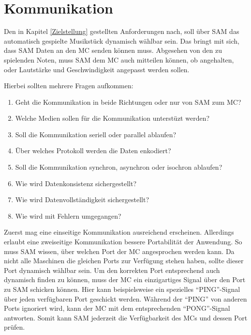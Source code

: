 \section{Kommunikation} \label{vorgehenSW-SPPP}


Den in Kapitel \ref{Zielstellung} gestellten Anforderungen nach, soll über \ac{SAM} das automatisch gespielte Musikstück dynamisch wählbar sein.
Das bringt mit sich, dass \ac{SAM} Daten an den \ac{MC} senden können muss.
Abgesehen von den zu spielenden Noten, muss \ac{SAM} dem \ac{MC} auch mitteilen können, ob angehalten, oder Lautstärke und Geschwindigkeit angepasst werden sollen.

Hierbei sollten mehrere Fragen aufkommen:
\begin{enumerate}
    \item Geht die Kommunikation in beide Richtungen oder nur von \ac{SAM} zum \ac{MC}?
    \item Welche Medien sollen für die Kommunikation unterstüzt werden?
    \item Soll die Kommunikation seriell oder parallel ablaufen?
    \item Über welches Protokoll werden die Daten enkodiert?
    \item Soll die Kommunikation synchron, asynchron oder isochron ablaufen?
    \item Wie wird Datenkonsistenz sichergestellt?
    \item Wie wird Datenvollständigkeit sichergestellt?
    \item Wie wird mit Fehlern umgegangen?
\end{enumerate}

Zuerst mag eine einseitige Kommunikation ausreichend erscheinen.
Allerdings erlaubt eine zweiseitige Kommunikation bessere Portabilität der Anwendung.
So muss \ac{SAM} wissen, über welchen Port der \ac{MC} angesprochen werden kann.
Da nicht alle Maschinen die gleichen Ports zur Verfügung stehen haben, sollte dieser Port dynamisch wählbar sein.
Um den korrekten Port entsprechend auch dynamisch finden zu können, muss der \ac{MC} ein einzigartiges Signal über den Port zu \ac{SAM} schicken können.
Hier kann beispielsweise ein spezielles \enquote{PING}-Signal über jeden verfügbaren Port geschickt werden.
Während der \enquote{PING} von anderen Ports ignoriert wird, kann der \ac{MC} mit dem entsprechenden \enquote{PONG}-Signal antworten.
Somit kann \ac{SAM} jederzeit die Verfügbarkeit des \ac{MC}s und dessen Port prüfen.

